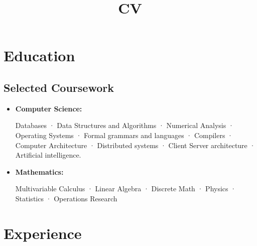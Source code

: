 \documentclass[11pt,a4paper,sans]{moderncv}        %
\title{CV}                                   %
\begin{document}
\makecvtitle

\section{Education}


\subsection{Selected Coursework}
\begin{itemize}
  \item \textbf{Computer Science:}
    \begin{small}
      Databases · Data Structures and Algorithms · Numerical Analysis · Operating Systems ·
      Formal grammars and languages · Compilers · Computer Architecture  · Distributed systems ·
      Client Server architecture · Artificial intelligence.
    \end{small}

    \item \textbf{Mathematics:}
    \begin{small}
      Multivariable Calculus · Linear Algebra · Discrete Math · Physics · Statistics · Operations Research
    \end{small}
\end{itemize}




\section{Experience}
\end{document}
